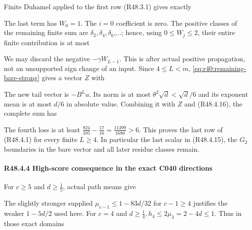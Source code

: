 Finite Duhamel applied to the first row (R48.3.1) gives exactly


The last term has \(W_{0}=1\). The \(i=0\) coefficient is zero. The positive classes of the remaining finite sum are \(\delta_2,\allowbreak \allowbreak \delta_4,\allowbreak \allowbreak \delta_6\),...; hence, using \(0\le W_j\le 2\), their entire finite contribution is at most


We may discard the negative \(-\gamma W_{L-1}\). This is after actual positive propagation, not an unsupported sign change of an input. Since \(4\le L<m\), \eqref{eq:r40:remaining-bare-strong} gives a vector \(Z\) with


The new tail vector is \(-B^L u\). Its norm is at most \(\theta^2 \sqrt{d} <\sqrt{d}/6\) and its exponent mean is at most \(d/6\) in absolute value. Combining it with \(Z\) and (R48.4.16), the complete sum has


The fourth loss is at least \(\frac{824}{105}-\frac{17}{16}=\frac{11399}{1680}>6\). This proves the last row of (R48.4.1) for every finite \(L\ge 4\). In particular the last scalar in (R48.4.15), the \(G_{2}\) boundaries in the bare vector and all later residue classes remain.

\paragraph{R48.4.4 High-score consequence in the exact C040 directions}\label{part:R48.4.4}

For \(c\ge 5\) and \(d\ge \frac{1}{5}\), actual path means give


The slightly stronger supplied \(\mu_{c-1}\le 1-83d/32\) for \(c-1\ge 4\) justifies the weaker \(1-5d/2\) used here. For \(c=4\) and \(d\ge \frac{1}{4},\allowbreak \allowbreak  h_{4}\le 2 \mu_{3}=2-4d\le 1\). Thus in those exact domains

